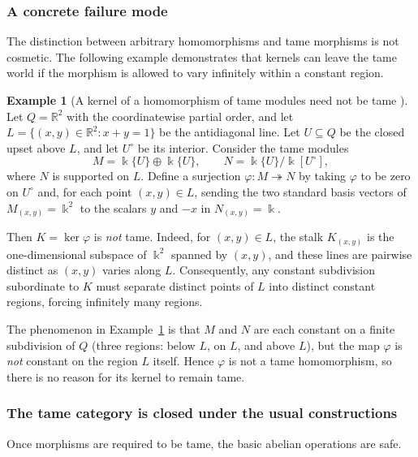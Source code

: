 \documentclass{article}
\newcommand{\kk}{\Bbbk}
\newcommand{\<}{\langle}
\renewcommand{\>}{\rangle}
\theoremstyle{definition}
\newtheorem{example}[theorem]{Example}
\theoremstyle{remark}
\begin{document}
	\subsubsection*{A concrete failure mode}

	The distinction between arbitrary homomorphisms and tame morphisms is not cosmetic.
	The following example demonstrates that kernels can leave the tame world if the morphism
	is allowed to vary infinitely within a constant region.

	\begin{example}[A kernel of a homomorphism of tame modules need not be tame {\cite[Ex.~4.25]{Mil20}}]
		\label{ex:kernel-not-tame}
		Let $Q=\mathbb{R}^2$ with the coordinatewise partial order, and let
		$L=\{(x,y)\in\mathbb{R}^2 : x+y=1\}$ be the antidiagonal line.
		Let $U\subseteq Q$ be the closed upset above $L$, and let $U^{\circ}$ be its interior.
		Consider the tame modules
		\[
			M=\kk\{U\}\oplus \kk\{U\},
			\qquad
			N=\kk\{U\}/\kk[U^{\circ}],
		\]
		where $N$ is supported on $L$.
		Define a surjection $\varphi\colon M\twoheadrightarrow N$ by taking $\varphi$ to be
		zero on $U^{\circ}$ and, for each point $(x,y)\in L$, sending the two standard basis
		vectors of $M_{(x,y)}=\kk^2$ to the scalars $y$ and $-x$ in $N_{(x,y)}=\kk$.

		Then $K=\ker\varphi$ is \emph{not} tame.  Indeed, for $(x,y)\in L$, the stalk $K_{(x,y)}$
		is the one-dimensional subspace of $\kk^2$ spanned by $(x,y)$, and these lines are pairwise
		distinct as $(x,y)$ varies along $L$.  Consequently, any constant subdivision subordinate to $K$
		must separate distinct points of $L$ into distinct constant regions, forcing infinitely many regions.
	\end{example}

	The phenomenon in Example~\ref{ex:kernel-not-tame} is that $M$ and $N$ are each constant on a
	finite subdivision of $Q$ (three regions: below $L$, on $L$, and above $L$), but the map
	$\varphi$ is \emph{not} constant on the region $L$ itself.  Hence $\varphi$ is not a tame
	homomorphism, so there is no reason for its kernel to remain tame.

	\subsubsection*{The tame category is closed under the usual constructions}

	Once morphisms are required to be tame, the basic abelian operations are safe.
\end{document}
